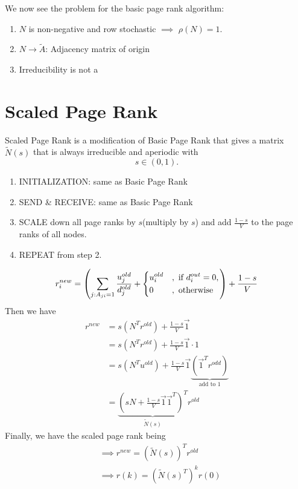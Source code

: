 \begin{problem}
We now see the problem for the basic page rank algorithm:
\begin{enumerate}
	\item \(N\) is non-negative and row stochastic \(\implies\) \(\rho(N) = 1\).
	\item \(N \to \widetilde{A}\): Adjacency matrix of origin
	\item Irreducibility is not a
\end{enumerate}
\end{problem}

\section{Scaled Page Rank}
Scaled Page Rank is a modification of Basic Page Rank that gives a matrix \(\widetilde{N}(s)\) that is always irreducible and aperiodic with
\[
	s\in \left( 0, 1 \right).
\]
\begin{enumerate}
	\item INITIALIZATION: same as Basic Page Rank
	\item SEND \& RECEIVE: same as Basic Page Rank
	\item SCALE down all page ranks by \(s\)(multiply by \(s\)) and add \(\frac{1-s}{V}\) to the page ranks of all nodes.
	\item REPEAT from step 2.
\end{enumerate}

\[
	r_{i}^{new} = \left(\sum\limits_{j:A_{ji} = 1} \frac{u_{j}^{old}}{d_{j}^{old}}+\begin{dcases}
		u_{i}^{old} & , \text{ if }d_{i}^{out} = 0, \\
		0           & , \text{ otherwise}
	\end{dcases}\right)+\frac{1-s}{V}
\]
Then we have
\[
	\begin{split}
		r^{new} &= s(N^{T}r^{old})+\frac{1-s}{V}\vec{1}\\
		&= s(N^{T}r^{old})+\frac{1-s}{V}\vec{1}\cdot 1\\
		&= s(N^{T}u^{old}) + \frac{1-s}{V}\vec{1} \underbrace{(\vec{1}^{T}r^{odd})}_{\text{add to }1}\\
		&= \underbrace{(sN + \frac{1-s}{V}\vec{1}\vec{1}^{T})^{T}}_{\widetilde{N}(s)} r^{old}
	\end{split}
\]
Finally, we have the scaled page rank being
\[
	\begin{split}
		&\implies r^{new} = (\widetilde{N}(s))^{T}r^{old}\\
		&\implies r(k) = (\widetilde{N}(s)^{T})^k r(0)
	\end{split}
\]

